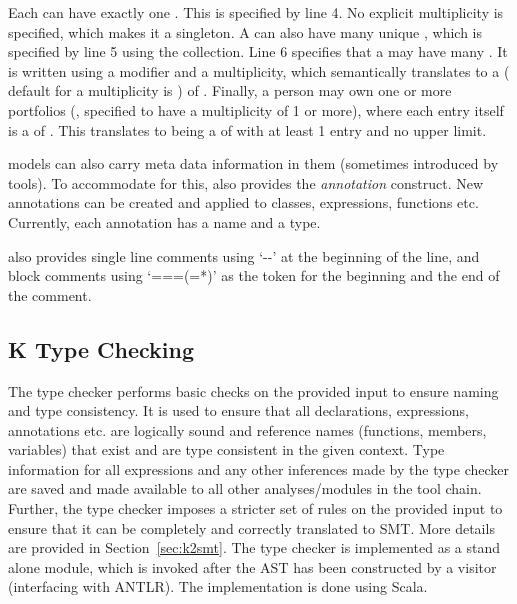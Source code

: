 Each  can have exactly one . This is
specified by line 4. No explicit multiplicity is specified, which
makes it a singleton.  A  can also have many unique
, which is specified by line 5 using the 
collection. Line 6 specifies that a  may have many
. It is written using a modifier and a multiplicity, which
semantically translates to a  (\Klang{} default for a
multiplicity is ) of . Finally, a person may own
one or more portfolios (, specified to have a
multiplicity of 1 or more), where each entry itself is a  of
. This translates to  being a  of
 with at least 1 entry and no upper limit.

\sysml{} models can also carry meta data information in them
(sometimes introduced by tools). To accommodate for this, \Klang{}
also provides the {\em annotation} construct. New annotations can be
created and applied to classes, expressions, functions etc. Currently,
each annotation has a name and a type.

\Klang{} also provides single line comments using `-{}-' at the
beginning of the line, and block comments using `===(=*)' as the token for
the beginning and the end of the comment.

\subsection{K Type Checking}

The \Klang{} type checker performs basic checks on the provided input
to ensure naming and type consistency. It is used to ensure that all
declarations, expressions, annotations etc. are logically sound and
reference names (functions, members, variables) that exist and are
type consistent in the given context. Type information for all
expressions and any other inferences made by the type checker are
saved and made available to all other analyses/modules in the \Klang{}
tool chain. Further, the type checker imposes a stricter set of rules
on the provided input to ensure that it can be completely and
correctly translated to SMT. More details are provided in
Section~\ref{sec:k2smt}. The type checker is implemented as a stand
alone module, which is invoked after the AST has been constructed by a
visitor (interfacing with ANTLR). The implementation is done using
Scala.

